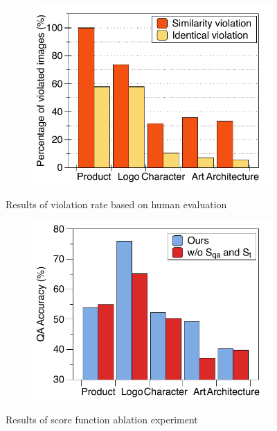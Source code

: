 \begin{figure}
\begin{minipage}[t]{0.33\textwidth}
\begin{subfigure}[t]{0.98\linewidth}
            \includegraphics[width=0.99\linewidth]{figure_folder/human_vote.pdf}
        \end{subfigure} 
        \vspace{-0.1in}
        \caption{\small Results of violation rate based on human evaluation}
        \label{fig:humaneval_vote}
    \end{minipage}
    \begin{minipage}[t]{0.33\textwidth}
        \begin{subfigure}[t]{0.98\linewidth}
            \centering
            \includegraphics[width=0.99\linewidth]{figure_folder/qa_score_ablation.pdf}
        \end{subfigure} 
        \vspace{-0.1in}
        \caption{\small Results of score function ablation experiment}
        \label{fig:ablation}
    \end{minipage}
    \vspace{-0.27in}
\end{figure}